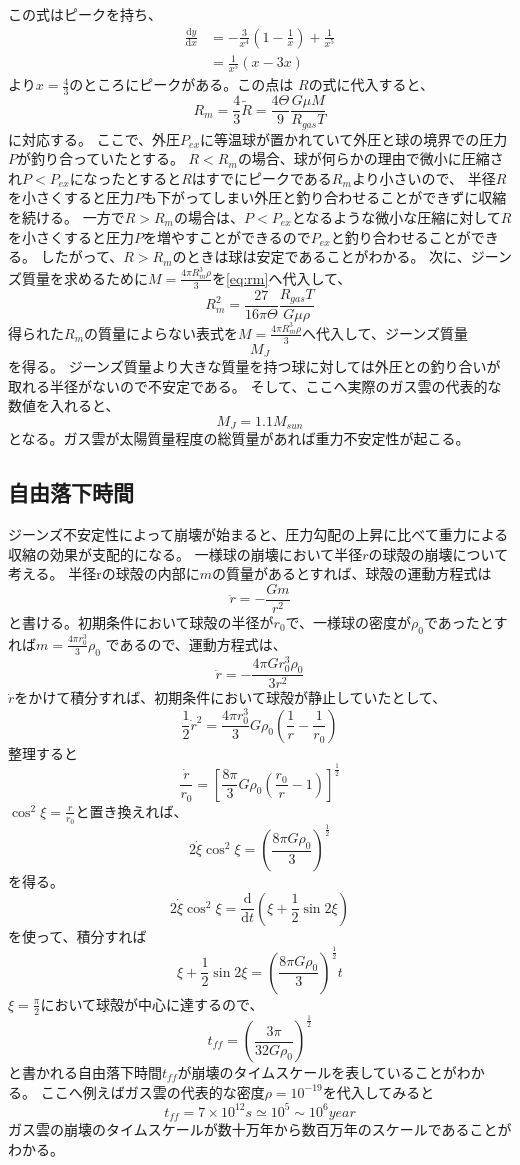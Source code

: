 \documentclass[a4j, dvipdfmx]{jsarticle}
\newcommand{\dder}[2][]{\frac{\mathrm{d}#1}{\mathrm{d}#2}}
\newcommand{\half}{\frac{1}{2}}
\newcommand{\beq}{\begin{equation}}
\newcommand{\eeq}{\end{equation}}
\begin{document}
この式はピークを持ち、
\begin{align}
    \dder[y]{x} &= - \frac{3}{x^4}\left(1 - \frac{1}{x}\right) + \frac{1}{x^5}\\
                &= \frac{1}{x^5}(x - 3x)
\end{align}
より$x = \frac{4}{3}$のところにピークがある。この点は
$R$の式に代入すると、
\beq
R_m = \frac{4}{3}\tilde{R} = \frac{4\Theta}{9} \frac{G\mu M}{R_{gas} T}\label{eq:rm}
\eeq
に対応する。
ここで、外圧$P_{ex}$に等温球が置かれていて外圧と球の境界での圧力$P$が釣り合っていたとする。
$R < R_m$の場合、球が何らかの理由で微小に圧縮され$P < P_{ex}$になったとすると$R$はすでにピークである$R_m$より小さいので、
半径$R$を小さくすると圧力$P$も下がってしまい外圧と釣り合わせることができずに収縮を続ける。
一方で$R> R_m$の場合は、$P < P_{ex}$となるような微小な圧縮に対して$R$を小さくすると圧力$P$を増やすことができるので$P_{ex}$と釣り合わせることができる。
したがって、$R > R_m$のときは球は安定であることがわかる。
次に、ジーンズ質量を求めるために$M = \frac{4\pi R_m^3 \rho}{3}$を\eqref{eq:rm}へ代入して、
\beq
R_m^2 = \frac{27}{16\pi\Theta} \frac{R_{gas} T}{G\mu \rho}
\eeq
得られた$R_m$の質量によらない表式を$M = \frac{4\pi R_m^3 \rho}{3}$へ代入して、ジーンズ質量
\beq
M_J 
\eeq
を得る。
ジーンズ質量より大きな質量を持つ球に対しては外圧との釣り合いが取れる半径がないので不安定である。
そして、ここへ実際のガス雲の代表的な数値を入れると、
\beq
M_J = 1.1 M_{sun}
\eeq
となる。ガス雲が太陽質量程度の総質量があれば重力不安定性が起こる。
\subsection{自由落下時間}
ジーンズ不安定性によって崩壊が始まると、圧力勾配の上昇に比べて重力による収縮の効果が支配的になる。
一様球の崩壊において半径$r$の球殻の崩壊について考える。
半径rの球殻の内部に$m$の質量があるとすれば、球殻の運動方程式は
\beq
    \ddot{r} = - \frac{Gm}{r^2}
\eeq
と書ける。初期条件において球殻の半径が$r_0$で、一様球の密度が$\rho_0$であったとすれば$m = \frac{4\pi r_0^3}{3}\rho_0$
であるので、運動方程式は、
\beq
\ddot{r} = - \frac{4\pi Gr_0^3 \rho_0}{3r^2}
\eeq
$\dot{r}$をかけて積分すれば、初期条件において球殻が静止していたとして、
\beq
\half \dot{r}^2 = \frac{4 \pi r_0^3}{3}G\rho_0\left(\frac{1}{r} - \frac{1}{r_0} \right)
\eeq
整理すると
\beq
\frac{\dot{r}}{r_0} = \left[ \frac{8 \pi }{3}G\rho_0\left(\frac{r_0}{r} - 1\right) \right]^\half
\eeq
$\cos^2\xi = \frac{r}{r_0}$と置き換えれば、
\beq
2\dot{\xi}\cos^2\xi = \left(\frac{8\pi G \rho_0}{3} \right)^\half
\eeq
を得る。
\beq
2\dot{\xi}\cos^2\xi = \dder[]{t} \left(\xi + \half\sin 2\xi \right)
\eeq
を使って、積分すれば
\beq
\xi + \half \sin 2\xi = \left(\frac{8\pi G \rho_0}{3} \right)^\half t
\eeq
$\xi = \frac{\pi}{2}$において球殻が中心に達するので、
\beq
t_{ff} = \left(\frac{3\pi}{32 G \rho_0} \right)^\half
\eeq
と書かれる自由落下時間$t_{ff}$が崩壊のタイムスケールを表していることがわかる。
ここへ例えばガス雲の代表的な密度$\rho = 10^{-19}$を代入してみると
\beq
t_{ff} = 7\times10^{12}s \simeq 10^5 \sim 10^6 year
\eeq
ガス雲の崩壊のタイムスケールが数十万年から数百万年のスケールであることがわかる。
\end{document}
